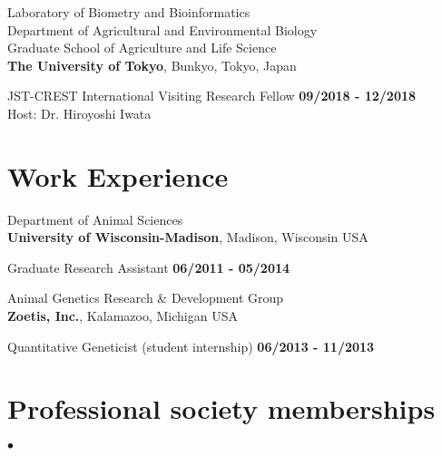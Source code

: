 \documentclass[margin,line,10pt]{res}
\newenvironment{list2}{
  \begin{list}{$\bullet$}{%
      \setlength{\itemsep}{0in}
      \setlength{\parsep}{0in} \setlength{\parskip}{0in}
      \setlength{\topsep}{0in} \setlength{\partopsep}{0in} 
      \setlength{\leftmargin}{0.2in}}}{\end{list}}
\begin{document}
\begin{resume}
Laboratory of Biometry and Bioinformatics\\
Department of Agricultural and Environmental Biology \\
Graduate School of Agriculture and Life Science \\
{\bf The University of Tokyo}, Bunkyo, Tokyo, Japan
\vspace{-.35cm}

JST-CREST International Visiting Research Fellow  \hfill {\bf 09/2018 - 12/2018}\\
Host: Dr. Hiroyoshi Iwata


  


\vspace{0.4cm}
\section{\sc Work \phantom{1cm} Experience}
Department of Animal Sciences\\
{\bf University of Wisconsin-Madison}, Madison, Wisconsin USA
\vspace{-.35cm}

Graduate Research Assistant   \hfill {\bf 06/2011 - 05/2014}\\
\vspace{-.4cm}

Animal Genetics Research \& Development  Group \\
{\bf Zoetis, Inc.}, Kalamazoo, Michigan USA

\vspace{-.35cm}

Quantitative Geneticist (student internship)   \hfill {\bf 06/2013 - 11/2013}\\








\vspace{0.5cm}
\section{\sc Professional society memberships}
\begin{list2}
 


\end{list2}
\end{resume}
\end{document}
